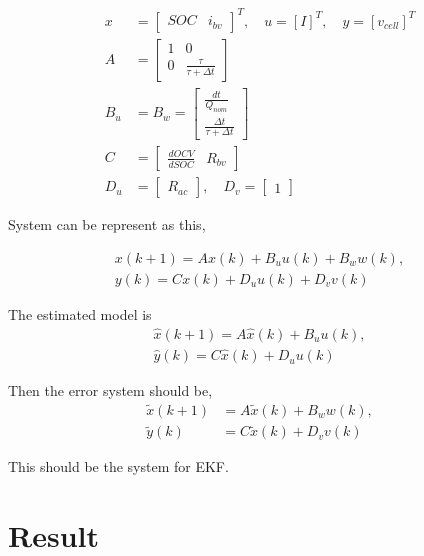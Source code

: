 \documentclass[11pt, a4paper]{article}
\theoremstyle{definition}
\theoremstyle{remark}
\begin{document}
\begin{align}
    x &= \begin{bmatrix}
        SOC &
        i_{bv}
    \end{bmatrix}^{T}, \quad u = \left[ I \right]^{T}, \quad y = \left[ v_{cell} \right]^{T} \\
    A &= \begin{bmatrix}
        1 & 0 \\
        0 & \frac{\tau}{\tau+\Delta t}
    \end{bmatrix} \\
    B_{u} &= B_{w} = \begin{bmatrix}
        \frac{dt}{Q_{nom}}\\
        \frac{\Delta t}{\tau + \Delta t}
    \end{bmatrix} \\
    C &= \begin{bmatrix}
        \frac{dOCV}{dSOC} & R_{bv}
    \end{bmatrix} \\
    D_{u} &= \begin{bmatrix}
        R_{ac}
    \end{bmatrix}, \quad D_{v} = \begin{bmatrix}
        1
    \end{bmatrix}
\end{align}

System can be represent as this,

\begin{align}
    x(k+1) = Ax(k) + B_{u}u(k) + B_{w}w(k), \\
    y(k) = Cx(k) + D_{u}u(k) + D_{v}v(k)
\end{align}

The estimated model is
\begin{align}
    \hat{x}(k+1) = A\hat{x}(k) + B_{u}u(k), \\
    \hat{y}(k) = C\hat{x}(k) + D_{u}u(k)
\end{align}

Then the error system should be,
\begin{align}
    \tilde{x}(k+1) &= A\tilde{x}(k) + B_{w}w(k), \\
    \tilde{y}(k) &= C\tilde{x}(k) + D_{v}v(k)
\end{align}

This should be the system for EKF.

\section{Result}
\end{document}
